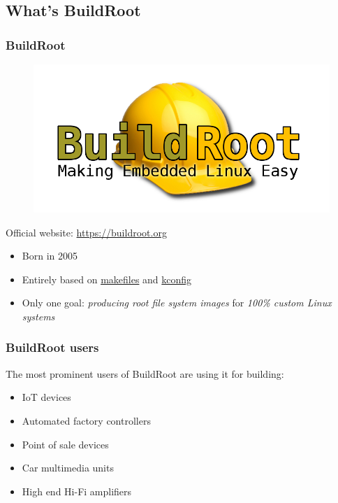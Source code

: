 \subsection{What's BuildRoot}
\begin{frame}
  \frametitle{BuildRoot}
  \begin{figure}
    \begin{center}
      \includegraphics[width=.5\textwidth]{logo-buildroot}
    \end{center}
  \end{figure}
  \begin{center}
    Official website: \url{https://buildroot.org}
  \end{center}
  \begin{itemize}
    \item Born in 2005
    \item Entirely based on \href{https://en.wikipedia.org/wiki/Make_(software)}{makefiles} and \href{https://www.kernel.org/doc/html/latest/kbuild/kconfig-language.html}{kconfig}
    \item Only one goal: \textit{producing root file system images} for \textit{100\% custom Linux systems}
  \end{itemize}
\end{frame}
\begin{frame}
  \frametitle{BuildRoot users}
  The most prominent users of BuildRoot are using it for building:
  \begin{itemize}
    \item IoT devices
    \item Automated factory controllers
    \item Point of sale devices
    \item Car multimedia units
    \item High end Hi-Fi amplifiers
  \end{itemize}
\end{frame}
